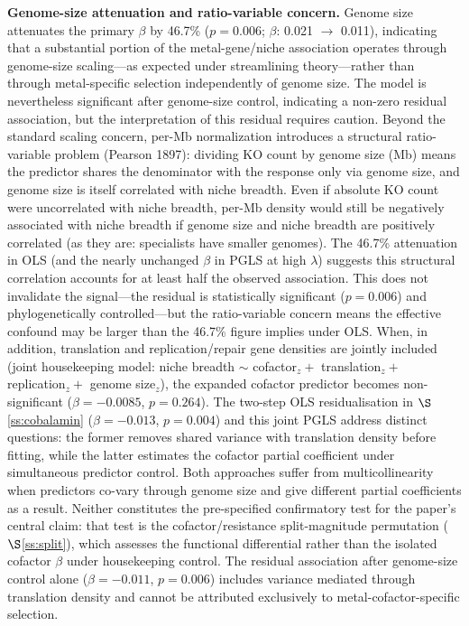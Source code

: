 \documentclass[times]{zHenriquesLab-StyleBioRxiv}
\begin{document}
\textbf{Genome-size attenuation and ratio-variable concern.} Genome size attenuates the primary $\beta$ by
46.7\% ($p = 0.006$; $\beta$: 0.021 $\to$ 0.011), indicating that a
substantial portion of the metal-gene/niche association operates through
genome-size scaling---as expected under streamlining theory---rather than through
metal-specific selection independently of genome size. The model is nevertheless
significant after genome-size control, indicating a non-zero residual
association, but the interpretation of this residual requires caution.
Beyond the standard scaling concern, per-Mb normalization introduces a structural
ratio-variable problem (Pearson 1897): dividing KO count by genome size (Mb) means
the predictor shares the denominator with the response only via genome size, and
genome size is itself correlated with niche breadth. Even if absolute KO count were
uncorrelated with niche breadth, per-Mb density would still be negatively associated
with niche breadth if genome size and niche breadth are positively correlated (as
they are: specialists have smaller genomes). The 46.7\% attenuation in OLS (and the
nearly unchanged $\beta$ in PGLS at high $\lambda$) suggests this structural
correlation accounts for at least half the observed association. This does not
invalidate the signal---the residual is statistically significant ($p = 0.006$) and
phylogenetically controlled---but the ratio-variable concern means the effective
confound may be larger than the 46.7\% figure implies under OLS.
When, in addition, translation and replication/repair gene densities are jointly
included (joint housekeeping model: niche breadth $\sim$ cofactor$_z +$ translation$_z +$
replication$_z +$ genome size$_z$), the expanded cofactor predictor becomes
non-significant ($\beta = -0.0085$, $p = 0.264$). The two-step OLS
residualisation in $\S$\ref{ss:cobalamin} ($\beta = -0.013$, $p = 0.004$) and
this joint PGLS address distinct questions: the former removes shared variance
with translation density before fitting, while the latter estimates the cofactor
partial coefficient under simultaneous predictor control. Both approaches suffer
from multicollinearity when predictors co-vary through genome size and give
different partial coefficients as a result. Neither constitutes the pre-specified
confirmatory test for the paper's central claim: that test is the
cofactor/resistance split-magnitude permutation ($\S$\ref{ss:split}), which
assesses the functional differential rather than the isolated cofactor $\beta$
under housekeeping control. The residual association after genome-size control
alone ($\beta = -0.011$, $p = 0.006$) includes variance mediated through
translation density and cannot be attributed exclusively to metal-cofactor-specific
selection.
\end{document}
